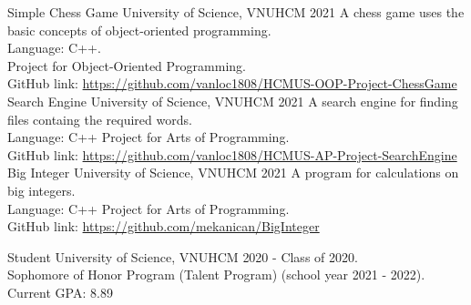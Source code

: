 \documentclass[11pt]{spidercv}
\begin{document}
    





    \begin{MainPart}

    \Experience
        {\ColorHighlight}
		{Simple Chess Game}
		{University of Science, VNUHCM}
        {2021}
        {   
            A chess game uses the basic concepts of object-oriented programming.\\
            Language: C++.\\
            Project for Object-Oriented Programming.\\
            GitHub link: \url{https://github.com/vanloc1808/HCMUS-OOP-Project-ChessGame}
        }
    \Experience
        {\ColorHighlight}
		{Search Engine}
		{University of Science, VNUHCM}
        {2021}
        {   
            A search engine for finding files containg the required words.\\
            Language: C++
            Project for Arts of Programming.\\
            GitHub link:
            \url{https://github.com/vanloc1808/HCMUS-AP-Project-SearchEngine}
        }
    \Experience
        {\ColorHighlight}
		{Big Integer}
		{University of Science, VNUHCM}
        {2021}
        {   
            A program for calculations on big integers.\\
            Language: C++
            Project for Arts of Programming.\\
            GitHub link: 
            \url{https://github.com/mekanican/BigInteger}
        }


    
    \Experience
        {\ColorHighlight}
		{Student}
		{University of Science, VNUHCM}
        {2020 - \faUndo}
        {   
            Class of 2020.\\
            Sophomore of Honor Program (Talent Program) (school year 2021 - 2022).\\
            Current GPA: 8.89
            }


\end{MainPart}
\end{document}
